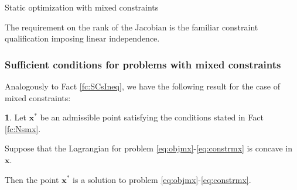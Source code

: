 \documentclass[10pt]{beamer}
\theoremstyle{definition}
\newtheorem{Fact}{\translate{Fact}}
\begin{document}
\begin{section}{Static optimization with mixed constraints}
\begin{frame}[fragile]
The requirement on the rank of the Jacobian is the familiar constraint qualification imposing linear independence.
\end{frame}

\begin{frame}[fragile]
\frametitle{Sufficient conditions for problems with mixed constraints}
Analogously to Fact \ref{fc:SCsIneq}, we have the following result for the case of mixed constraints:

\begin{Fact}
Let $ \mathbf{x^*} $ be an admissible point satisfying the conditions stated in Fact \ref{fc:Nsmx}.

Suppose that the Lagrangian for problem \eqref{eq:objmx}-\eqref{eq:constrmx} is concave in $ \mathbf{x} $.\bigskip

Then the point $ \mathbf{x^*} $ is a solution to problem \eqref{eq:objmx}-\eqref{eq:constrmx}.
\label{fc:Scsmx}
\end{Fact}
\end{frame}

\end{section}
\end{document}

